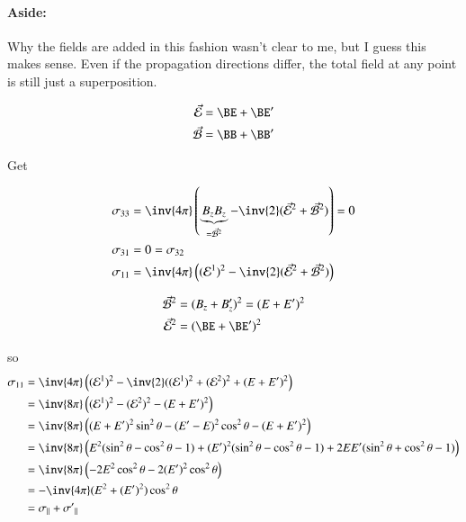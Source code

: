 \paragraph{Aside:} Why the fields are added in this fashion wasn't clear to me, but I guess this makes sense.  Even if the propagation directions differ, the total field at any point is still just a superposition.

\begin{align}\label{eqn:relativisticElectrodynamicsT9:150}
\vec{\mathcal{E}} &= \BE + \BE' \\
\vec{\mathcal{B}} &= \BB + \BB'
\end{align}

Get 

\begin{align}\label{eqn:relativisticElectrodynamicsT9:170}
\sigma_{3 3} &= \inv{4 \pi} \left( \underbrace{B_z B_z}_{=\vec{\mathcal{B}}^2} - \inv{2} (\vec{\mathcal{E}}^2 + \vec{\mathcal{B}}^2) \right) = 0 \\
\sigma_{3 1} &= 0 = \sigma_{3 2} \\
\sigma_{1 1} &= \inv{4 \pi} \left( (\mathcal{E}^1)^2 - \inv{2} (\vec{\mathcal{E}}^2 + \vec{\mathcal{B}}^2) \right) 
\end{align}

\begin{align}\label{eqn:relativisticElectrodynamicsT9:190}
\vec{\mathcal{B}}^2 &= (B_z + B_z')^2 = (E + E')^2 \\
\vec{\mathcal{E}}^2 &= (\BE + \BE')^2
\end{align}

so
\begin{align*}
\sigma_{1 1} 
&= \inv{4 \pi} \left( (\mathcal{E}^1)^2 - \inv{2} ((\mathcal{E}^1)^2 + (\mathcal{E}^2)^2 + (E + E')^2 \right) \\
&= \inv{8 \pi} \left( (\mathcal{E}^1)^2 - (\mathcal{E}^2)^2 - (E + E')^2 \right) \\
&= \inv{8 \pi} \left( 
(E + E')^2 \sin^2\theta 
-(E' - E)^2 \cos^2\theta -(E + E')^2
\right) \\
&= \inv{8 \pi} \left( 
E^2( \sin^2\theta - \cos^2\theta - 1)
+(E')^2( \sin^2\theta - \cos^2\theta - 1)
+ 2 E E' (\sin^2\theta + \cos^2\theta -1 )
\right) \\
&= \inv{8 \pi} \left( - 2 E^2 \cos^2\theta - 2 (E')^2 \cos^2\theta \right) \\
&= -\inv{4 \pi} (E^2 + (E')^2) \cos^2\theta \\
&= \sigma_\parallel + {\sigma'}_\parallel
\end{align*}

